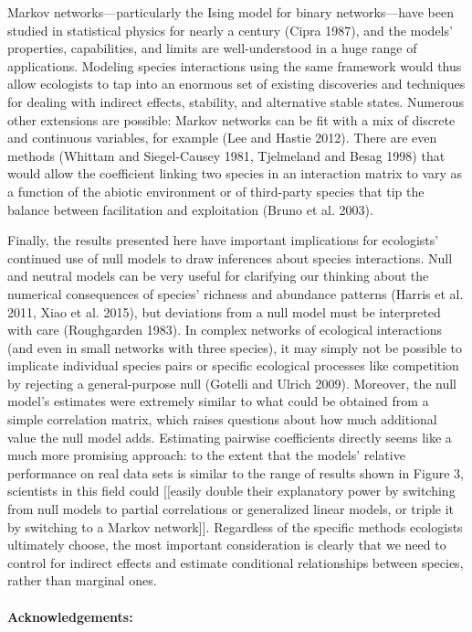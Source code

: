 \documentclass[12pt,]{article}
\begin{document}
\begin{spacing}{1.9}
\begin{flushleft}
Markov networks---particularly the Ising model for binary
networks---have been studied in statistical physics for nearly a century
(Cipra 1987), and the models' properties, capabilities, and limits are
well-understood in a huge range of applications. Modeling species
interactions using the same framework would thus allow ecologists to tap
into an enormous set of existing discoveries and techniques for dealing
with indirect effects, stability, and alternative stable states.
Numerous other extensions are possible: Markov networks can be fit with
a mix of discrete and continuous variables, for example (Lee and Hastie
2012). There are even methods (Whittam and Siegel-Causey 1981,
Tjelmeland and Besag 1998) that would allow the coefficient linking two
species in an interaction matrix to vary as a function of the abiotic
environment or of third-party species that tip the balance between
facilitation and exploitation (Bruno et al. 2003).

Finally, the results presented here have important implications for
ecologists' continued use of null models to draw inferences about
species interactions. Null and neutral models can be very useful for
clarifying our thinking about the numerical consequences of species'
richness and abundance patterns (Harris et al. 2011, Xiao et al. 2015),
but deviations from a null model must be interpreted with care
(Roughgarden 1983). In complex networks of ecological interactions (and
even in small networks with three species), it may simply not be
possible to implicate individual species pairs or specific ecological
processes like competition by rejecting a general-purpose null (Gotelli
and Ulrich 2009). Moreover, the null model's estimates were extremely
similar to what could be obtained from a simple correlation matrix,
which raises questions about how much additional value the null model
adds. Estimating pairwise coefficients directly seems like a much more
promising approach: to the extent that the models' relative performance
on real data sets is similar to the range of results shown in Figure 3,
scientists in this field could {[}{[}easily double their explanatory
power by switching from null models to partial correlations or
generalized linear models, or triple it by switching to a Markov
network{]}{]}. Regardless of the specific methods ecologists ultimately
choose, the most important consideration is clearly that we need to
control for indirect effects and estimate conditional relationships
between species, rather than marginal ones.

\paragraph{Acknowledgements:}\label{acknowledgements}


\end{flushleft}
\end{spacing}
\end{document}
